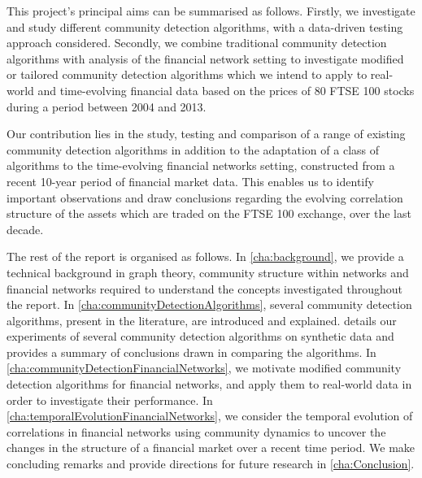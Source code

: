 This project's principal aims can be summarised as follows.
Firstly, we investigate and study different community detection algorithms, with a data-driven testing approach considered.
Secondly, we combine traditional community detection algorithms with analysis of the financial network setting to investigate modified or tailored community detection algorithms which we intend to apply to real-world and time-evolving financial data based on the prices of 80 FTSE 100 stocks during a period between 2004 and 2013.

Our contribution lies in the study, testing and comparison of a range of existing community detection algorithms in addition to the adaptation of a class of algorithms to the time-evolving financial networks setting, constructed from a recent 10-year period of financial market data.
This enables us to identify important observations and draw conclusions regarding the evolving correlation structure of the assets which are traded on the FTSE 100 exchange, over the last decade.

The rest of the report is organised as follows.
In \cref{cha:background}, we provide a technical background in graph theory, community structure within networks and financial networks required to understand the concepts investigated throughout the report.
In \cref{cha:communityDetectionAlgorithms}, several community detection algorithms, present in the literature, are introduced and explained.
 details our experiments of several community detection algorithms on synthetic data and provides a summary of conclusions drawn in comparing the algorithms.
In \cref{cha:communityDetectionFinancialNetworks}, we motivate modified community detection algorithms for financial networks, and apply them to real-world data in order to investigate their performance.
In \cref{cha:temporalEvolutionFinancialNetworks}, we consider the temporal evolution of correlations in financial networks using community dynamics to uncover the changes in the structure of a financial market over a recent time period.
We make concluding remarks and provide directions for future research in \cref{cha:Conclusion}.